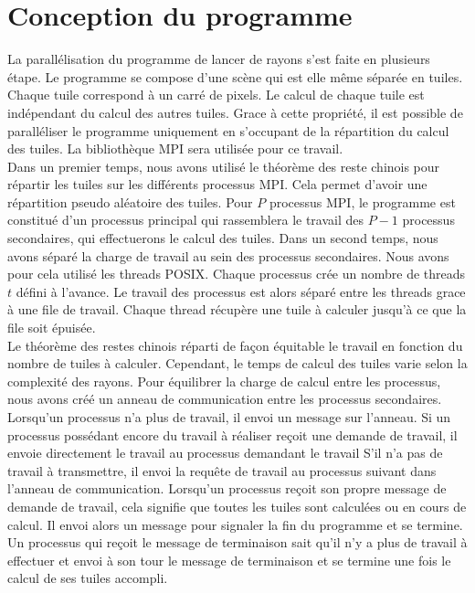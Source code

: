 \section{Conception du programme} %
\label{sec:conception}

La parallélisation du programme de lancer de rayons s'est faite en plusieurs étape. Le programme se compose d'une scène qui est elle même séparée en tuiles. Chaque tuile correspond à un carré de pixels. Le calcul de chaque tuile est indépendant du calcul des autres tuiles. Grace à cette propriété, il est possible de paralléliser le programme uniquement en s'occupant de la répartition du calcul des tuiles. La bibliothèque MPI sera utilisée pour ce travail.\\

Dans un premier temps, nous avons utilisé le théorème des reste chinois pour répartir les tuiles sur les différents processus MPI. Cela permet d'avoir une répartition pseudo aléatoire des tuiles. Pour $P$ processus MPI, le programme est constitué d'un processus principal qui rassemblera le travail des $P-1$ processus secondaires, qui effectuerons le calcul des tuiles. Dans un second temps, nous avons séparé la charge de travail au sein des processus secondaires. Nous avons pour cela utilisé les threads POSIX. Chaque processus crée un nombre de threads $t$ défini à l'avance. Le travail des processus est alors séparé entre les threads grace à une file de travail. Chaque thread récupère une tuile à calculer jusqu'à ce que la file soit épuisée.\\

Le théorème des restes chinois réparti de façon équitable le travail en fonction du nombre de tuiles à calculer. Cependant, le temps de calcul des tuiles varie selon la complexité des rayons. Pour équilibrer la charge de calcul entre les processus, nous avons créé un anneau de communication entre les processus secondaires. Lorsqu'un processus n'a plus de travail, il envoi un message sur l'anneau. Si un processus possédant encore du travail à réaliser reçoit une demande de travail, il envoie directement le travail au processus demandant le travail S'il n'a pas de travail à transmettre, il envoi la requête de travail au processus suivant dans l'anneau de communication. Lorsqu'un processus reçoit son propre message de demande de travail, cela signifie que toutes les tuiles sont calculées ou en cours de calcul. Il envoi alors un message pour signaler la fin du programme et se termine. Un processus qui reçoit le message de terminaison sait qu'il n'y a plus de travail à effectuer et envoi à son tour le message de terminaison et se termine une fois le calcul de ses tuiles accompli.

